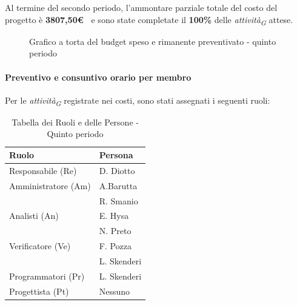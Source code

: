 Al termine del secondo periodo, l'ammontare parziale totale del costo del progetto è \textbf{ 3807,50\euro\ } e sono state completate il \textbf{100\%} delle \textit{attività}\textsubscript{\textit{G}} attese.


\begin{figure}[H]
    \centering
    \begin{minipage}[b]{0.45\textwidth}
        \centering
        \caption{Grafico a torta del budget speso e rimanente preventivato - quinto periodo}
        \label{fig:Budget_speso_5}
    \end{minipage}
    \vspace{1cm}
\end{figure}

\paragraph{Preventivo e consuntivo orario per membro} \hspace{1pt}
Per le \textit{attività}\textsubscript{\textit{G}} registrate nei costi, sono stati assegnati i seguenti ruoli:

\begin{table}[H]
    \centering
    \begin{tabular}{|l|l|}
    \hline
    \textbf{Ruolo} & \textbf{Persona} \\
    \hline
    \hline
    Responsabile (Re) & D. Diotto \\
    \hline
    Amministratore (Am) & A.Barutta  \\
    & R. Smanio \\
    \hline
    Analisti (An)   & E. Hysa \\
    & N. Preto \\
    \hline
    Verificatore (Ve)   & F. Pozza \\
    & L. Skenderi\\
     \hline
    Programmatori (Pr)  & L. Skenderi \\    
    \hline
    Progettista (Pt) & Nessuno \\
    \hline
    \end{tabular}
    \caption{Tabella dei Ruoli e delle Persone - Quinto periodo}
    \label{tab:Ruoli_persone_5}
    \end{table}
    

